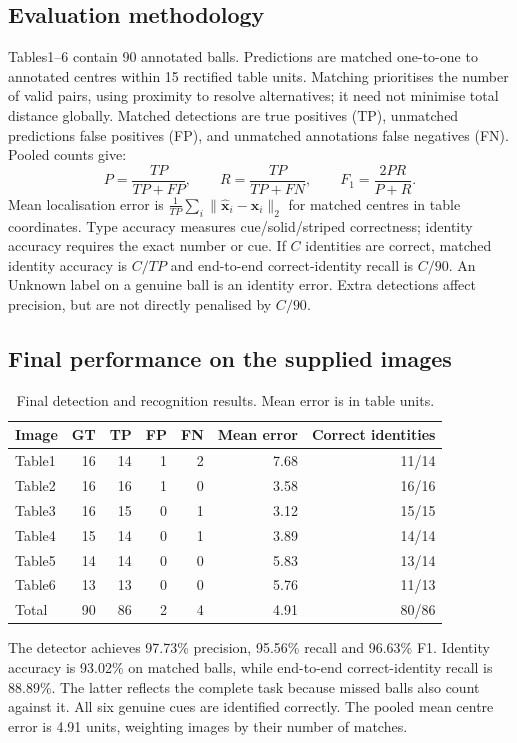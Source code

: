 \documentclass[12pt,a4paper]{article}
\begin{document}
\subsection{Evaluation methodology}
Tables1--6 contain 90 annotated balls. Predictions are matched one-to-one to annotated
centres within 15 rectified table units. Matching prioritises the number of valid
pairs, using proximity to resolve alternatives; it need not minimise total distance
globally. Matched detections are true positives (TP), unmatched predictions false
positives (FP), and unmatched annotations false negatives (FN). Pooled counts give:
\[
P=\frac{TP}{TP+FP},\qquad R=\frac{TP}{TP+FN},\qquad F_1=\frac{2PR}{P+R}.
\]
Mean localisation error is $\frac{1}{TP}\sum_i\|\hat{\mathbf{x}}_i-\mathbf{x}_i\|_2$
for matched centres in table coordinates. Type accuracy measures cue/solid/striped
correctness; identity accuracy requires the exact number or cue. If $C$ identities
are correct, matched identity accuracy is $C/TP$ and end-to-end correct-identity
recall is $C/90$. An Unknown label on a genuine ball is an identity error.
Extra detections affect precision, but are not directly penalised by $C/90$.

\subsection{Final performance on the supplied images}
\begin{table}[H]\centering\small
\caption{Final detection and recognition results. Mean error is in table units.}
\begin{tabular}{lrrrrrr}\toprule
Image & GT & TP & FP & FN & Mean error & Correct identities\\\midrule
Table1 &16&14&1&2&7.68&11/14\\
Table2 &16&16&1&0&3.58&16/16\\
Table3 &16&15&0&1&3.12&15/15\\
Table4 &15&14&0&1&3.89&14/14\\
Table5 &14&14&0&0&5.83&13/14\\
Table6 &13&13&0&0&5.76&11/13\\\midrule
Total &90&86&2&4&4.91&80/86\\\bottomrule
\end{tabular}
\end{table}
The detector achieves 97.73\% precision, 95.56\% recall and 96.63\% F1. Identity
accuracy is 93.02\% on matched balls, while end-to-end correct-identity recall is
88.89\%. The latter reflects the complete task because missed balls also
count against it. All six genuine cues are identified correctly. The pooled mean
centre error is 4.91 units, weighting images by their number of matches.
\end{document}

